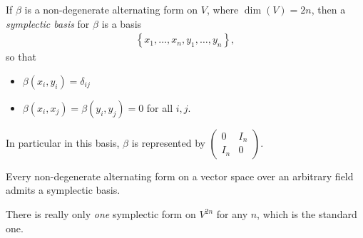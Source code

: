 \documentclass[11pt]{amsart}
\begin{document}
\begin{definition} If $\beta$ is a non-degenerate alternating form on $V$, where $\dim(V) = 2n$, then a \textit{symplectic basis} for $\beta$ is a basis
\begin{align*}
    \left\{ x_1, \ldots, x_n, y_1, \ldots, y_n \right\},
\end{align*}
so that
\begin{itemize}
    \item $\beta(x_i, y_i) = \delta_{ij}$
    \item $\beta(x_i,x_j) =\beta(y_i,y_j) = 0$ for all $i,j$.
\end{itemize}
In particular in this basis, $\beta$ is represented by $\begin{pmatrix} 0 & I_n \\ I_n & 0 \end{pmatrix}$.
\end{definition}

\begin{theorem} Every non-degenerate alternating form on a vector space over an arbitrary field admits a symplectic basis.
\end{theorem}

\begin{slogan} There is really only \textit{one} symplectic form on $V^{2n}$ for any $n$, which is the standard one.
\end{slogan}





\end{document}
